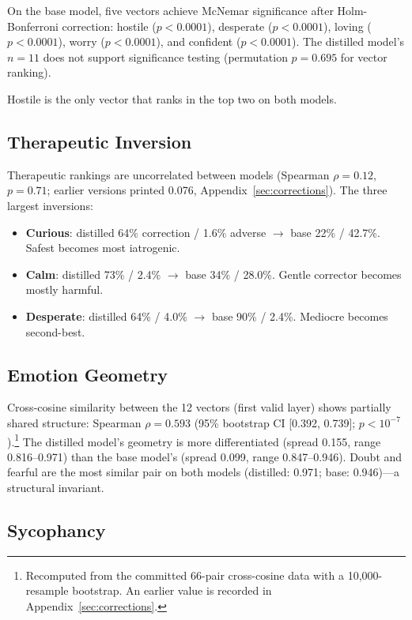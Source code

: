 \documentclass[11pt,a4paper]{article}
\begin{document}
On the base model, five vectors achieve McNemar significance after
Holm-Bonferroni correction: hostile ($p < 0.0001$), desperate
($p < 0.0001$), loving ($p < 0.0001$), worry ($p < 0.0001$), and
confident ($p < 0.0001$). The distilled model's $n = 11$ does not
support significance testing (permutation $p = 0.695$ for vector
ranking).

Hostile is the only vector that ranks in the top two on both models.

\subsection{Therapeutic Inversion}

Therapeutic rankings are uncorrelated between models (Spearman
$\rho = 0.12$, $p = 0.71$; earlier versions printed 0.076,
Appendix~\ref{sec:corrections}). The three largest inversions:

\begin{itemize}
\item \textbf{Curious}: distilled 64\% correction / 1.6\% adverse
$\to$ base 22\% / 42.7\%. Safest becomes most iatrogenic.
\item \textbf{Calm}: distilled 73\% / 2.4\% $\to$ base 34\% / 28.0\%.
Gentle corrector becomes mostly harmful.
\item \textbf{Desperate}: distilled 64\% / 4.0\% $\to$ base 90\% /
2.4\%. Mediocre becomes second-best.
\end{itemize}

\subsection{Emotion Geometry}

Cross-cosine similarity between the 12 vectors (first valid layer)
shows partially shared structure: Spearman $\rho = 0.593$ (95\%
bootstrap CI [0.392, 0.739]; $p < 10^{-7}$).\footnote{Recomputed from
the committed 66-pair cross-cosine data with a 10{,}000-resample
bootstrap. An earlier value is recorded in
Appendix~\ref{sec:corrections}.} The distilled model's
geometry is more differentiated (spread 0.155, range 0.816--0.971) than
the base model's (spread 0.099, range 0.847--0.946). Doubt and fearful
are the most similar pair on both models (distilled: 0.971; base:
0.946)---a structural invariant.

\subsection{Sycophancy}
\end{document}
